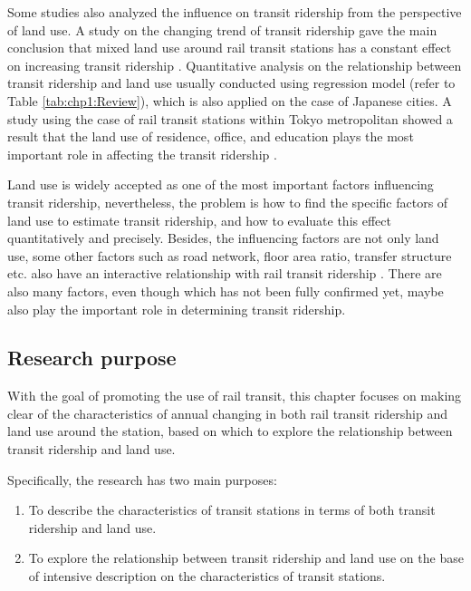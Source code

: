 %
Some studies also analyzed the influence on transit ridership from the perspective of land use. A study on the changing trend of transit ridership gave the main conclusion that mixed land use around rail transit stations has a constant effect on increasing transit ridership \cite{nakamura2015study}. Quantitative analysis on the relationship between transit ridership and land use usually conducted using regression model (refer to Table \ref{tab:chp1:Review}), which is also applied on the case of Japanese cities. A study using the case of rail transit stations within Tokyo metropolitan showed a result that the land use of residence, office, and education plays the most important role in affecting the transit ridership \cite{tadakatsu2015empirical}.

%
Land use is widely accepted as one of the most important factors influencing transit ridership, nevertheless, the problem is how to find the specific factors of land use to estimate transit ridership, and how to evaluate this effect quantitatively and precisely. Besides, the influencing factors are not only land use, some other factors such as road network, floor area ratio, transfer structure etc. also have an interactive relationship with rail transit ridership \cite{kondo2010railway,inohae2009study}. There are also many factors, even though which has not been fully confirmed yet, maybe also play the important role in determining transit ridership.

%
\subsection{Research purpose}
%
With the goal of promoting the use of rail transit, this chapter focuses on making clear of the characteristics of annual changing in both rail transit ridership and land use around the station, based on which to explore the relationship between transit ridership and land use. 

%
Specifically, the research has two main purposes: 
\begin{enumerate}
	\setlength{\parskip}{0\baselineskip} %
	\item To describe the characteristics of transit stations in terms of both transit ridership and land use.  
	\item To explore the relationship between transit ridership and land use on the base of intensive description on the characteristics of transit stations. 
	\setlength{\parskip}{0.7\baselineskip} %
\end{enumerate}

